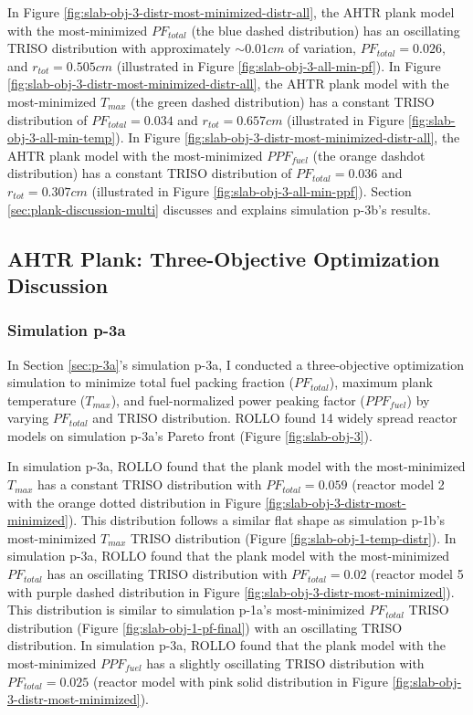 In Figure \ref{fig:slab-obj-3-distr-most-minimized-distr-all}, the \gls{AHTR} plank model 
with the most-minimized $PF_{total}$ (the blue dashed distribution) has an 
oscillating TRISO distribution with approximately $\sim0.01cm$ of variation, 
$PF_{total} = 0.026$, and $r_{tot}=0.505cm$ (illustrated in Figure 
\ref{fig:slab-obj-3-all-min-pf}).
In Figure \ref{fig:slab-obj-3-distr-most-minimized-distr-all}, the \gls{AHTR} plank 
model with the most-minimized $T_{max}$ (the green dashed distribution) has a constant 
TRISO distribution of $PF_{total}=0.034$ and $r_{tot}=0.657cm$
(illustrated in Figure \ref{fig:slab-obj-3-all-min-temp}).
In Figure \ref{fig:slab-obj-3-distr-most-minimized-distr-all}, the \gls{AHTR} plank 
model with the most-minimized $PPF_{fuel}$ (the orange dashdot distribution) has a 
constant TRISO distribution of $PF_{total} = 0.036$ and $r_{tot}=0.307cm$
(illustrated in Figure \ref{fig:slab-obj-3-all-min-ppf}).
Section \ref{sec:plank-discussion-multi} discusses and explains simulation p-3b's 
results.

\subsection{AHTR Plank: Three-Objective Optimization Discussion}

\subsubsection{Simulation p-3a}
In Section \ref{sec:p-3a}'s simulation p-3a, I conducted a three-objective 
optimization simulation to minimize total fuel packing fraction ($PF_{total}$), 
maximum plank temperature ($T_{max}$), and fuel-normalized power peaking factor 
($PPF_{fuel}$) by varying $PF_{total}$ and TRISO distribution.
\gls{ROLLO} found 14 widely spread reactor models on simulation p-3a's Pareto 
front (Figure \ref{fig:slab-obj-3}). 

In simulation p-3a, \gls{ROLLO} found that the plank model with the most-minimized 
$T_{max}$ has a constant TRISO distribution with $PF_{total} = 0.059$
(reactor model 2 with the orange dotted distribution in Figure 
\ref{fig:slab-obj-3-distr-most-minimized}). 
This distribution follows a similar flat shape as simulation p-1b's most-minimized 
$T_{max}$ TRISO distribution (Figure \ref{fig:slab-obj-1-temp-distr}).
In simulation p-3a, \gls{ROLLO} found that the plank model with the most-minimized 
$PF_{total}$ has an oscillating TRISO distribution with $PF_{total} = 0.02$
(reactor model 5 with purple dashed distribution in Figure 
\ref{fig:slab-obj-3-distr-most-minimized}). 
This distribution is similar to simulation p-1a's most-minimized $PF_{total}$ TRISO 
distribution (Figure \ref{fig:slab-obj-1-pf-final}) with an oscillating TRISO 
distribution.
In simulation p-3a, \gls{ROLLO} found that the plank model with the most-minimized 
$PPF_{fuel}$ has a slightly oscillating TRISO distribution with $PF_{total} = 0.025$ 
(reactor model with pink solid distribution in Figure 
\ref{fig:slab-obj-3-distr-most-minimized}). 


